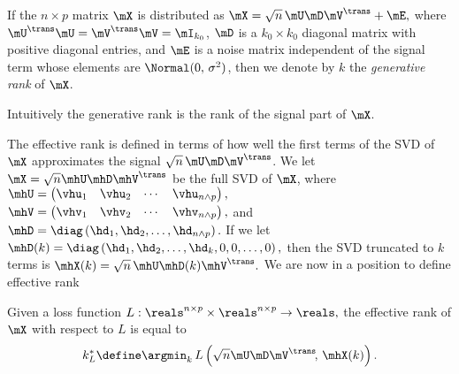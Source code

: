 \begin{definition}
    If the $n \times p$ matrix $\mX$ is distributed as
    \(
        \mX = \sqrt{n} \, \mU \mD \mV^\trans + \mE,
    \)
    where $\mU^\trans \mU = \mV^\trans \mV = \mI_{k_0}$, $\mD$ is a
    $k_0 \times k_0$ diagonal matrix with positive diagonal entries, and $\mE$
    is a noise matrix independent of the signal term whose elements are
    \iid $\Normal( 0, \, \sigma^2 )$, then
    we denote by $k$ the \emph{generative rank} of $\mX$.
\end{definition}

\noindent 
Intuitively the generative rank is the rank of the signal part of $\mX$.

The effective rank is defined in terms of how well the first terms of the
SVD of $\mX$ approximates the signal $\sqrt{n} \, \mU \mD \mV^\trans$.  We
let $\mX = \sqrt{n} \mhU \mhD \mhV^\trans$ be the full SVD of $\mX$, where
\(
    \mhU
    =
    \left(
    \begin{matrix}
        \vhu_1 & \vhu_2 & \cdots & \vhu_{n\wedge p}
    \end{matrix}
    \right),
\)
\(
    \mhV
    =
    \left(
    \begin{matrix}
        \vhv_1 & \vhv_2 & \cdots & \vhv_{n\wedge p}
    \end{matrix}
    \right),
\)
and
\(
    \mhD
    =
    \diag \left(
        \hd_1, \hd_2, \ldots, \hd_{n\wedge p}
    \right).
\)
If we let
\(
    \mhD(k)
    =
    \diag \left(
        \hd_1, \hd_2, \ldots, \hd_k, 0, 0, \ldots, 0
    \right),
\)
then the SVD truncated to $k$ terms is
\(
    \mhX(k)
    =
    \sqrt{n} \,
    \mhU \mhD(k) \mhV^\trans.
\)
We are now in a position to define effective rank

\begin{definition}
    Given a loss function
    \(
        L : \reals^{n \times p} \times \reals^{n \times p} \to \reals,
    \)
    the effective rank of $\mX$ with respect to $L$ is equal to
    \[
        k_L^\ast
        \define
        \argmin_k \, 
            L \left( 
                \sqrt{n} \mU \mD \mV^\trans\!, \, \mhX(k) 
            \right).
    \]
\end{definition}

